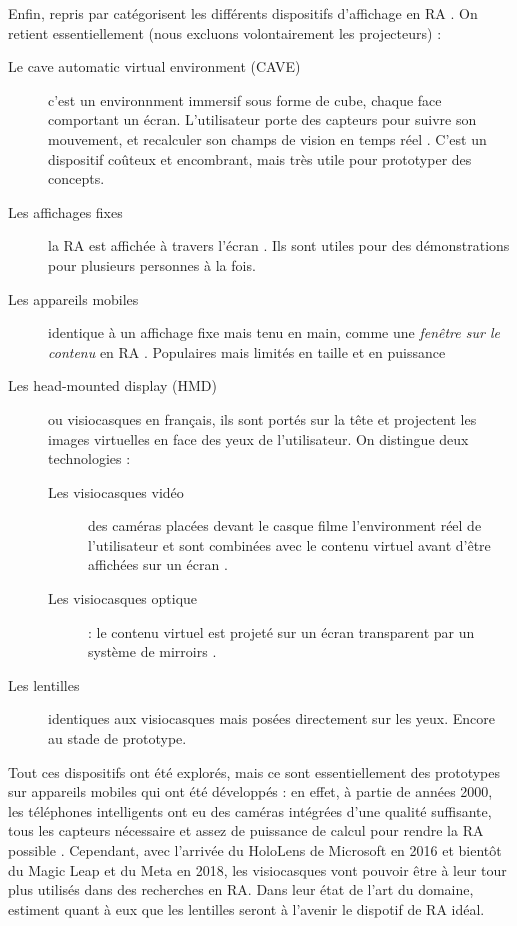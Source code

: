 Enfin, \cite{Buxton1998} repris par \cite{Bimber2005} catégorisent les différents dispositifs d'affichage en RA . On retient essentiellement (nous excluons volontairement les projecteurs) :
\begin{description}
  \item [Le \foreignlanguage{english}{cave automatic virtual environment} (CAVE)] c'est un environnment immersif sous forme de cube, chaque face comportant un écran. L'utilisateur porte des capteurs pour suivre son mouvement, et recalculer son champs de vision en temps réel . C'est un dispositif coûteux et encombrant, mais très utile pour prototyper des concepts.
  \item [Les affichages fixes] la RA est affichée à travers l'écran . Ils sont utiles pour des démonstrations pour plusieurs personnes à la fois.
  \item [Les appareils mobiles] identique à un affichage fixe mais tenu en main, comme une \emph{fenêtre sur le contenu} en RA . Populaires mais limités en taille et en puissance
  \item [Les \foreignlanguage{english}{head-mounted display} (HMD)] ou visiocasques en français, ils sont portés sur la tête et projectent les images virtuelles en face des yeux de l'utilisateur. On distingue deux technologies :
  \begin{description}
    \item [Les visiocasques vidéo] des caméras placées devant le casque filme l'environment réel de l'utilisateur et sont combinées avec le contenu virtuel avant d'être affichées sur un écran .
    \item [Les visiocasques optique] : le contenu virtuel est projeté sur un écran transparent par un système de mirroirs .
  \end{description}
  \item [Les lentilles] identiques aux visiocasques mais posées directement sur les yeux. Encore au stade de prototype.
\end{description}

Tout ces dispositifs ont été explorés, mais ce sont essentiellement des prototypes sur appareils mobiles qui ont été développés : en effet, à partie de années 2000, les téléphones intelligents ont eu des caméras intégrées d'une qualité suffisante, tous les capteurs nécessaire et assez de puissance de calcul pour rendre la RA possible \cite{Huang2013}. Cependant, avec l'arrivée du HoloLens de Microsoft en 2016 et bientôt du Magic Leap et du Meta en 2018, les visiocasques vont pouvoir être à leur tour plus utilisés dans des recherches en RA. Dans leur état de l'art du domaine, \cite{VanKrevelen2010} estiment quant à eux que les lentilles seront à l'avenir le dispotif de RA idéal.

